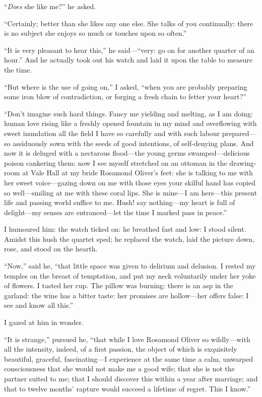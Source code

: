 \enquote{\emph{Does} she like me?} he asked.

\enquote{Certainly; better than she likes any one else. She talks of
	you continually: there is no subject she enjoys so much or touches upon
	so often.}

\enquote{It is very pleasant to hear this,} he said---\enquote{very: go
	on for another quarter of an hour.} And he actually took out his watch
and laid it upon the table to measure the time.

\enquote{But where is the use of going on,} I asked, \enquote{when you
	are probably preparing some iron blow of contradiction, or forging a
	fresh chain to fetter your heart?}

\enquote{Don't imagine such hard things. Fancy me yielding and melting,
	as I am doing: human love rising like a freshly opened fountain in my
	mind and overflowing with sweet inundation all the field I have so
	carefully and with such labour prepared---so assiduously sown with the
	seeds of good intentions, of self-denying plans. And now it is deluged
	with a nectarous flood---the young germs swamped---delicious poison
	cankering them: now I see myself stretched on an ottoman in the
	drawing-room at Vale Hall at my bride Rosamond Oliver's feet: she is
	talking to me with her sweet voice---gazing down on me with those eyes
	your skilful hand has copied so well---smiling at me with these coral
	lips. She is mine---I am hers---this present life and passing world
	suffice to me. Hush! say nothing---my heart is full of delight---my
	senses are entranced---let the time I marked pass in peace.}

I humoured him: the watch ticked on: he breathed fast and low: I stood
silent. Amidst this hush the quartet sped; he replaced the watch, laid
the picture down, rose, and stood on the hearth.

\enquote{Now,} said he, \enquote{that little space was given to delirium
	and delusion. I rested my temples on the breast of temptation, and put
	my neck voluntarily under her yoke of flowers. I tasted her cup. The
	pillow was burning: there is an asp in the garland: the wine has a
	bitter taste: her promises are hollow---her offers false: I see and know
	all this.}

I gazed at him in wonder.

\enquote{It is strange,} pursued he, \enquote{that while I love Rosamond
	Oliver so wildly---with all the intensity, indeed, of a first passion,
	the object of which is exquisitely beautiful, graceful, fascinating---I
	experience at the same time a calm, unwarped consciousness that she
	would not make me a good wife; that she is not the partner suited to me;
	that I should discover this within a year after marriage; and that to
	twelve months' rapture would succeed a lifetime of regret. This I
	know.}

